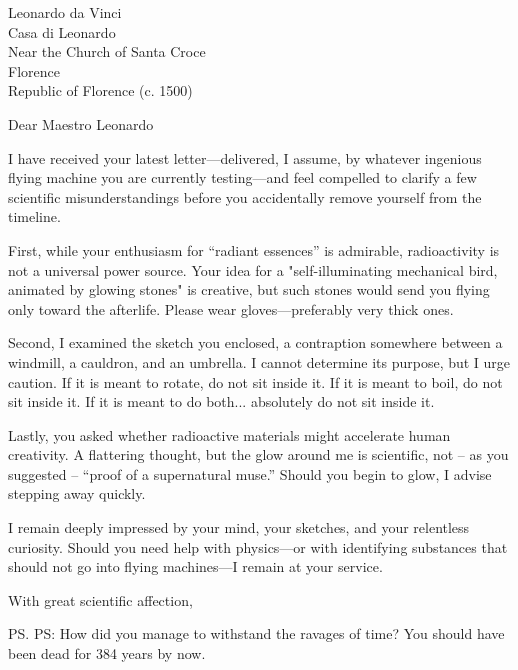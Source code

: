 \documentclass[
paper=a4,
parskip=half,
firstfoot=false,
enlargefirstpage=true,
]{scrlttr2}
\begin{document}
\begin{letter}{
Leonardo da Vinci\\
Casa di Leonardo\\
Near the Church of Santa Croce\\
Florence\\
Republic of Florence (c. 1500)
}

\opening{Dear Maestro Leonardo}

I have received your latest letter---delivered, I assume, by whatever ingenious flying
machine you are currently testing---and feel compelled to clarify a few scientific
misunderstandings before you accidentally remove yourself from the timeline.

First, while your enthusiasm for \enquote{radiant essences} is admirable, radioactivity is
not a universal power source. Your idea for a "self-illuminating mechanical bird,
animated by glowing stones" is creative, but such stones would send you flying only
toward the afterlife. Please wear gloves---preferably very thick ones.

Second, I examined the sketch you enclosed, a contraption somewhere between a windmill,
a cauldron, and an umbrella. I cannot determine its purpose, but I urge caution. If it
is meant to rotate, do not sit inside it. If it is meant to boil, do not sit inside it.
If it is meant to do both... absolutely do not sit inside it.

Lastly, you asked whether radioactive materials might accelerate human creativity.
A flattering thought, but the glow around me is scientific, not -- as you
suggested -- \enquote{proof of a supernatural muse.} Should you begin to glow,
I advise stepping away quickly.

I remain deeply impressed by your mind, your sketches, and your relentless curiosity.
Should you need help with physics---or with identifying substances that should not go
into flying machines---I remain at your service.

\closing{With great scientific affection,}
\ps{PS: How did you manage to withstand the ravages of time?
You should have been dead for 384 years by now.}
\end{letter}
\thispagestyle{empty}
\pagestyle{empty}
\end{document}
